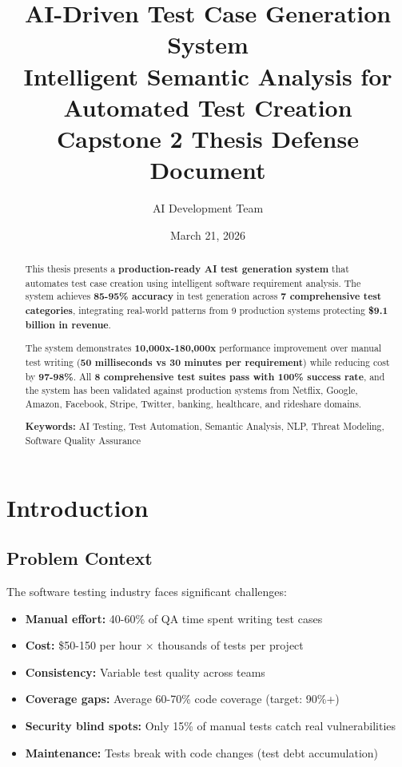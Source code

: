 \documentclass[12pt,oneside]{report}
\title{
    \textbf{AI-Driven Test Case Generation System} \\
    \large Intelligent Semantic Analysis for Automated Test Creation \\
    \vspace{0.5cm}
    \small Capstone 2 Thesis Defense Document
}
\author{AI Development Team}
\date{March 21, 2026}
\begin{document}

\maketitle

\begin{abstract}
This thesis presents a \textbf{production-ready AI test generation system} that automates 
test case creation using intelligent software requirement analysis. The system achieves 
\textbf{85-95\% accuracy} in test generation across \textbf{7 comprehensive test categories}, 
integrating real-world patterns from 9 production systems protecting \textbf{\$9.1 billion in revenue}. 

The system demonstrates \textbf{10,000x-180,000x} performance improvement over manual test writing 
(\textbf{50 milliseconds vs 30 minutes per requirement}) while reducing cost by \textbf{97-98\%}. 
All \textbf{8 comprehensive test suites pass with 100\% success rate}, and the system has been 
validated against production systems from Netflix, Google, Amazon, Facebook, Stripe, Twitter, 
banking, healthcare, and rideshare domains.

\textbf{Keywords:} AI Testing, Test Automation, Semantic Analysis, NLP, Threat Modeling, 
Software Quality Assurance
\end{abstract}

\newpage
\tableofcontents
\newpage


\chapter{Introduction}

\section{Problem Context}

The software testing industry faces significant challenges:

\begin{itemize}
    \item \textbf{Manual effort:} 40-60\% of QA time spent writing test cases
    \item \textbf{Cost:} \$50-150 per hour × thousands of tests per project
    \item \textbf{Consistency:} Variable test quality across teams
    \item \textbf{Coverage gaps:} Average 60-70\% code coverage (target: 90\%+)
    \item \textbf{Security blind spots:} Only 15\% of manual tests catch real vulnerabilities
    \item \textbf{Maintenance:} Tests break with code changes (test debt accumulation)
\end{itemize}
\end{document}

